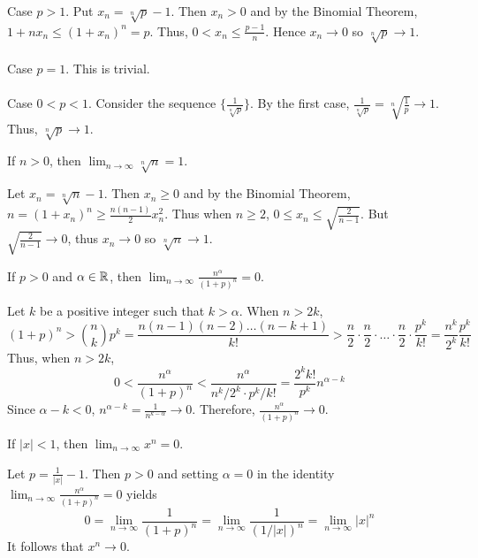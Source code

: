 \documentclass{mathnotes}
\begin{document}
\begin{pf}
  Case $p>1$. Put $x_n=\sqrt[n]{p}-1$. Then $x_n>0$ and by the Binomial
  Theorem, $1+nx_n\le(1+x_n)^n=p$. Thus, $0<x_n\le\frac{p-1}{n}$. Hence
  $x_n\to0$ so $\sqrt[n]{p}\to1$.\\\\
  Case $p=1$. This is trivial.\\\\
  Case $0<p<1$. Consider the sequence $\{\frac{1}{\sqrt[n]{p}}\}$. By the first
  case, $\frac{1}{\sqrt[n]{p}}=\sqrt[n]{\frac{1}{p}}\to1$. Thus,
  $\sqrt[n]{p}\to1$.
\end{pf}

\begin{prop}
  If $n>0$, then $\lim_{n\to\infty}\sqrt[n]{n}=1$.
\end{prop}

\begin{pf}
  Let $x_n=\sqrt[n]{n}-1$. Then $x_n\ge0$ and by the Binomial Theorem,
  $n=(1+x_n)^n\ge\frac{n(n-1)}{2}x_n^2$. Thus when $n\ge2$, $0\le
  x_n\le\sqrt{\frac{2}{n-1}}$. But $\sqrt{\frac{2}{n-1}}\to0$, thus $x_n\to 0$
  so $\sqrt[n]{n}\to1$.
\end{pf}

\begin{prop}
  If $p>0$ and $\alpha\in\mathbb{R}$, then
  $\lim_{n\to\infty}\frac{n^\alpha}{(1+p)^n}=0$.
\end{prop}

\begin{pf}
  Let $k$ be a positive integer such that $k>\alpha$. When $n>2k$,
  $$(1+p)^n>\binom{n}{k}p^k=\frac{n(n-1)(n-2)\ldots(n-k+1)}{k!}>
  \frac{n}{2}\cdot\frac{n}{2}\cdot\ldots\cdot\frac{n}{2}
  \cdot\frac{p^k}{k!}=\frac{n^k}{2^k}\frac{p^k}{k!}$$
  Thus, when $n>2k$,
  $$0<\frac{n^\alpha}{(1+p)^n}<\frac{n^\alpha}{n^k/2^k\cdot
  p^k/k!}=\frac{2^kk!}{p^k}n^{\alpha-k}$$
  Since $\alpha-k<0$, $n^{\alpha-k}=\frac{1}{n^{k-\alpha}}\to0$. Therefore,
  $\frac{n^\alpha}{(1+p)^n}\to0$.
\end{pf}

\begin{prop}
  If $|x|<1$, then $\lim_{n\to\infty}x^n=0$.
\end{prop}

\begin{pf}
  Let $p=\frac{1}{|x|}-1$. Then $p>0$ and setting $\alpha=0$ in the identity
  $\lim_{n\to\infty}\frac{n^\alpha}{(1+p)^n}=0$ yields
  $$0=\lim_{n\to\infty}\frac{1}{(1+p)^n}=\lim_{n\to\infty}\frac{1}{(1/|x|)^n}
  =\lim_{n\to\infty}|x|^n$$
  It follows that $x^n\to0$.
\end{pf}
\end{document}
